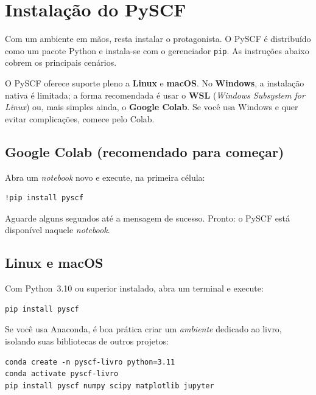 \documentclass[11pt,a4paper,openany]{book}
\newcommand{\code}[1]{\texttt{#1}}
\newcommand{\pyscf}{\textsf{PySCF}}
\newcommand{\python}{\textsf{Python}}
\begin{document}
\section{Instalação do PySCF}
\label{sec:instalacao}

Com um ambiente em mãos, resta instalar o protagonista. O \pyscf{} é distribuído
como um pacote \python{} e instala-se com o gerenciador \code{pip}. As instruções
abaixo cobrem os principais cenários.

\begin{caixaatencao}
O \pyscf{} oferece suporte pleno a \textbf{Linux} e \textbf{macOS}. No
\textbf{Windows}, a instalação nativa é limitada; a forma recomendada é usar o
\textbf{WSL} (\emph{Windows Subsystem for Linux}) ou, mais simples ainda, o
\textbf{Google Colab}. Se você usa Windows e quer evitar complicações, comece
pelo Colab.
\end{caixaatencao}

\subsection{Google Colab (recomendado para começar)}

Abra um \emph{notebook} novo e execute, na primeira célula:

\begin{lstlisting}[style=console]
!pip install pyscf
\end{lstlisting}

\noindent
Aguarde alguns segundos até a mensagem de sucesso. Pronto: o \pyscf{} está
disponível naquele \emph{notebook}.

\subsection{Linux e macOS}

Com \python{}~3.10 ou superior instalado, abra um terminal e execute:

\begin{lstlisting}[style=console]
pip install pyscf
\end{lstlisting}

\noindent
Se você usa Anaconda, é boa prática criar um \emph{ambiente} dedicado ao livro,
isolando suas bibliotecas de outros projetos:

\begin{lstlisting}[style=console]
conda create -n pyscf-livro python=3.11
conda activate pyscf-livro
pip install pyscf numpy scipy matplotlib jupyter
\end{lstlisting}
\end{document}
